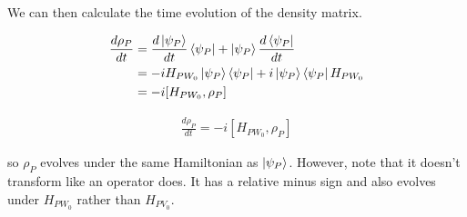 \documentclass[12pt]{article}
\newcommand{\ddt}[1]{\frac{d #1}{dt}}
\begin{document}
We can then calculate the time evolution of the density matrix.

\begin{align}
\ddt{\rho_P} &= \ddt{\ket{\psi_P}}\bra{\psi_P} + \ket{\psi_P} \ddt{\bra{\psi_P}}\\
&= -iH_{PW_0} \ket{\psi_P}\bra{\psi_P} + i \ket{\psi_P}\bra{\psi_P}H_{PW_0}\\
&= -i [H_{PW_0},\rho_P]
\end{align}

\begin{align}
\boxed{
\ddt{\rho_P} = -i[H_{PW_0},\rho_P]	
}
\end{align}

so $\rho_P$ evolves under the same Hamiltonian as $\ket{\psi_P}$. However, note that it doesn't transform like an operator does. It has a relative minus sign and also evolves under $H_{PW_0}$ rather than $H_{PV_0}$.
\end{document}
